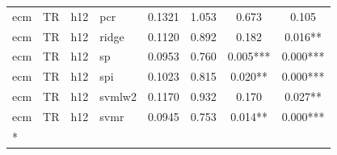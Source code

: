 \begin{ThreePartTable}
\begin{longtable}[t]{llclcccc}
ecm & TR & h12 & pcr & 0.1321 & 1.053 & 0.673 & 0.105\\
ecm & TR & h12 & ridge & 0.1120 & 0.892 & 0.182 & 0.016**\\
ecm & TR & h12 & sp & 0.0953 & 0.760 & 0.005*** & 0.000***\\
ecm & TR & h12 & spi & 0.1023 & 0.815 & 0.020** & 0.000***\\
ecm & TR & h12 & svmlw2 & 0.1170 & 0.932 & 0.170 & 0.027**\\
ecm & TR & h12 & svmr & 0.0945 & 0.753 & 0.014** & 0.000***\\*
\end{longtable}
\end{ThreePartTable}
\endgroup{}
